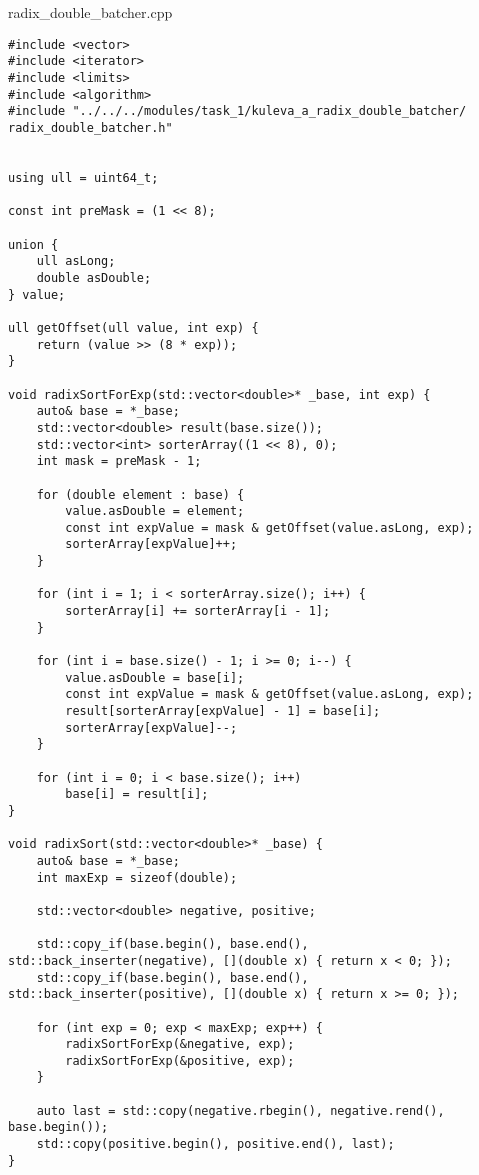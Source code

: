 \documentclass[12pt,a4paper]{article}
\begin{document}
\section{} radix\_double\_batcher.cpp
\begin{lstlisting}
#include <vector>
#include <iterator>
#include <limits>
#include <algorithm>
#include "../../../modules/task_1/kuleva_a_radix_double_batcher/ radix_double_batcher.h"


using ull = uint64_t;

const int preMask = (1 << 8);

union {
    ull asLong;
    double asDouble;
} value;

ull getOffset(ull value, int exp) {
    return (value >> (8 * exp));
}

void radixSortForExp(std::vector<double>* _base, int exp) {
    auto& base = *_base;
    std::vector<double> result(base.size());
    std::vector<int> sorterArray((1 << 8), 0);
    int mask = preMask - 1;

    for (double element : base) {
        value.asDouble = element;
        const int expValue = mask & getOffset(value.asLong, exp);
        sorterArray[expValue]++;
    }

    for (int i = 1; i < sorterArray.size(); i++) {
        sorterArray[i] += sorterArray[i - 1];
    }

    for (int i = base.size() - 1; i >= 0; i--) {
        value.asDouble = base[i];
        const int expValue = mask & getOffset(value.asLong, exp);
        result[sorterArray[expValue] - 1] = base[i];
        sorterArray[expValue]--;
    }

    for (int i = 0; i < base.size(); i++)
        base[i] = result[i];
}

void radixSort(std::vector<double>* _base) {
    auto& base = *_base;
    int maxExp = sizeof(double);

    std::vector<double> negative, positive;

    std::copy_if(base.begin(), base.end(), std::back_inserter(negative), [](double x) { return x < 0; });
    std::copy_if(base.begin(), base.end(), std::back_inserter(positive), [](double x) { return x >= 0; });

    for (int exp = 0; exp < maxExp; exp++) {
        radixSortForExp(&negative, exp);
        radixSortForExp(&positive, exp);
    }

    auto last = std::copy(negative.rbegin(), negative.rend(), base.begin());
    std::copy(positive.begin(), positive.end(), last);
}


\end{lstlisting}
\end{document}
